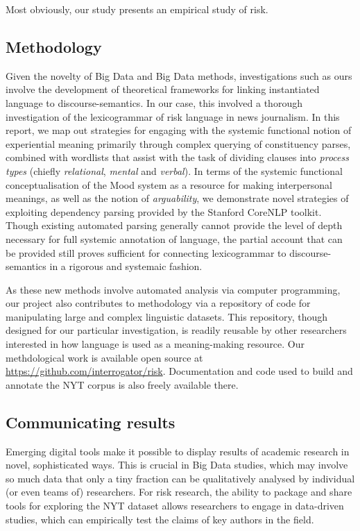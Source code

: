 Most obviously, our study presents an empirical study of risk.

\subsection{Methodology}

Given the novelty of Big Data and Big Data methods, investigations such as ours involve the development of theoretical frameworks for linking instantiated language to discourse-semantics. In our case, this involved a thorough investigation of the lexicogrammar of risk language in news journalism. In this report, we map out strategies for engaging with the systemic functional notion of experiential meaning primarily through complex querying of constituency parses, combined with wordlists that assist with the task of dividing clauses into \emph{process types} (chiefly \emph{relational}, \emph{mental} and \emph{verbal}). In terms of the systemic functional conceptualisation of the Mood system as a resource for making interpersonal meanings, as well as the notion of \emph{arguability}, we demonstrate novel strategies of exploiting dependency parsing provided by the Stanford CoreNLP toolkit. Though existing automated parsing generally cannot provide the level of depth necessary for full systemic annotation of language, the partial account that can be provided still proves sufficient for connecting lexicogrammar to discourse-semantics in a rigorous and systemaic fashion.

As these new methods involve automated analysis via computer programming, our project also contributes to methodology via a repository of code for manipulating large and complex linguistic datasets. This repository, though designed for our particular investigation, is readily reusable by other researchers interested in how language is used as a meaning-making resource. Our methdological work is available open source at \url{https://github.com/interrogator/risk}. Documentation and code used to build and annotate the NYT corpus is also freely available there.

\subsection{Communicating results}

Emerging digital tools make it possible to display results of academic research in novel, sophisticated ways. This is crucial in Big Data studies, which may involve so much data that only a tiny fraction can be qualitatively analysed by individual (or even teams of) researchers. For risk research, the ability to package and share tools for exploring the NYT dataset allows researchers to engage in data-driven studies, which can empirically test the claims of key authors in the field.

